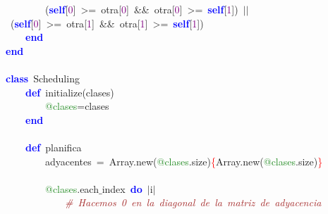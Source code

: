 \mbox{}\ \ \ \ \ \ \ \ \textcolor{BrickRed}{(}\textbf{\textcolor{Blue}{self}}\textcolor{BrickRed}{[}\textcolor{Purple}{0}\textcolor{BrickRed}{]}\ \textcolor{BrickRed}{\textgreater{}=}\ otra\textcolor{BrickRed}{[}\textcolor{Purple}{0}\textcolor{BrickRed}{]}\ \textcolor{BrickRed}{\&\&}\ otra\textcolor{BrickRed}{[}\textcolor{Purple}{0}\textcolor{BrickRed}{]}\ \textcolor{BrickRed}{\textgreater{}=}\ \textbf{\textcolor{Blue}{self}}\textcolor{BrickRed}{[}\textcolor{Purple}{1}\textcolor{BrickRed}{])}\ \textcolor{BrickRed}{$|$$|$}\ \textcolor{BrickRed}{(}\textbf{\textcolor{Blue}{self}}\textcolor{BrickRed}{[}\textcolor{Purple}{0}\textcolor{BrickRed}{]}\ \textcolor{BrickRed}{\textgreater{}=}\ otra\textcolor{BrickRed}{[}\textcolor{Purple}{1}\textcolor{BrickRed}{]}\ \textcolor{BrickRed}{\&\&}\ otra\textcolor{BrickRed}{[}\textcolor{Purple}{1}\textcolor{BrickRed}{]}\ \textcolor{BrickRed}{\textgreater{}=}\ \textbf{\textcolor{Blue}{self}}\textcolor{BrickRed}{[}\textcolor{Purple}{1}\textcolor{BrickRed}{])} \\
\mbox{}\ \ \ \ \textbf{\textcolor{Blue}{end}} \\
\mbox{}\textbf{\textcolor{Blue}{end}} \\
\mbox{} \\
\mbox{}\textbf{\textcolor{Blue}{class}}\ Scheduling \\
\mbox{}\ \ \ \ \textbf{\textcolor{Blue}{def}}\ initialize\textcolor{BrickRed}{(}clases\textcolor{BrickRed}{)} \\
\mbox{}\ \ \ \ \ \ \ \ \textcolor{ForestGreen}{@clases}\textcolor{BrickRed}{=}clases \\
\mbox{}\ \ \ \ \textbf{\textcolor{Blue}{end}} \\
\mbox{}\ \ \ \  \\
\mbox{}\ \ \ \ \textbf{\textcolor{Blue}{def}}\ planifica \\
\mbox{}\ \ \ \ \ \ \ \ adyacentes\ \textcolor{BrickRed}{=}\ Array\textcolor{BrickRed}{.}new\textcolor{BrickRed}{(}\textcolor{ForestGreen}{@clases}\textcolor{BrickRed}{.}size\textcolor{BrickRed}{)}\textcolor{Red}{\{}Array\textcolor{BrickRed}{.}new\textcolor{BrickRed}{(}\textcolor{ForestGreen}{@clases}\textcolor{BrickRed}{.}size\textcolor{BrickRed}{)}\textcolor{Red}{\}} \\
\mbox{}\ \ \ \ \ \ \ \  \\
\mbox{}\ \ \ \ \ \ \ \ \textcolor{ForestGreen}{@clases}\textcolor{BrickRed}{.}each$\_$index\ \textbf{\textcolor{Blue}{do}}\ \textcolor{BrickRed}{$|$}i\textcolor{BrickRed}{$|$} \\
\mbox{}\ \ \ \ \ \ \ \ \ \ \ \ \textit{\textcolor{Brown}{\#\ Hacemos\ 0\ en\ la\ diagonal\ de\ la\ matriz\ de\ adyacencia}} \\

